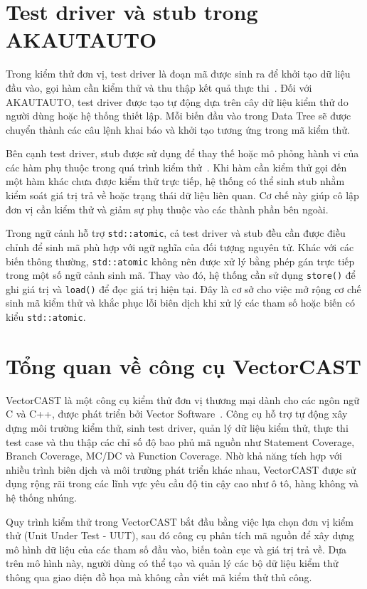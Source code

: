 \section{Test driver và stub trong AKAUTAUTO}

Trong kiểm thử đơn vị, test driver là đoạn mã được sinh ra để khởi tạo dữ liệu đầu vào, gọi hàm cần kiểm thử và thu thập kết quả thực thi~\cite{nguyenducanh2015}. Đối với AKAUTAUTO, test driver được tạo tự động dựa trên cây dữ liệu kiểm thử do người dùng hoặc hệ thống thiết lập. Mỗi biến đầu vào trong Data Tree sẽ được chuyển thành các câu lệnh khai báo và khởi tạo tương ứng trong mã kiểm thử.

Bên cạnh test driver, stub được sử dụng để thay thế hoặc mô phỏng hành vi của các hàm phụ thuộc trong quá trình kiểm thử~\cite{trannguyenhuong2022stub}. Khi hàm cần kiểm thử gọi đến một hàm khác chưa được kiểm thử trực tiếp, hệ thống có thể sinh stub nhằm kiểm soát giá trị trả về hoặc trạng thái dữ liệu liên quan. Cơ chế này giúp cô lập đơn vị cần kiểm thử và giảm sự phụ thuộc vào các thành phần bên ngoài.

Trong ngữ cảnh hỗ trợ \texttt{std::atomic}, cả test driver và stub đều cần được điều chỉnh để sinh mã phù hợp với ngữ nghĩa của đối tượng nguyên tử. Khác với các biến thông thường, \texttt{std::atomic} không nên được xử lý bằng phép gán trực tiếp trong một số ngữ cảnh sinh mã. Thay vào đó, hệ thống cần sử dụng \texttt{store()} để ghi giá trị và \texttt{load()} để đọc giá trị hiện tại. Đây là cơ sở cho việc mở rộng cơ chế sinh mã kiểm thử và khắc phục lỗi biên dịch khi xử lý các tham số hoặc biến có kiểu \texttt{std::atomic}.

\section{Tổng quan về công cụ VectorCAST}

VectorCAST là một công cụ kiểm thử đơn vị thương mại dành cho các ngôn ngữ C và C++, được phát triển bởi Vector Software~\cite{vectorcast2025}. Công cụ hỗ trợ tự động xây dựng môi trường kiểm thử, sinh test driver, quản lý dữ liệu kiểm thử, thực thi test case và thu thập các chỉ số độ bao phủ mã nguồn như Statement Coverage, Branch Coverage, MC/DC và Function Coverage. Nhờ khả năng tích hợp với nhiều trình biên dịch và môi trường phát triển khác nhau, VectorCAST được sử dụng rộng rãi trong các lĩnh vực yêu cầu độ tin cậy cao như ô tô, hàng không và hệ thống nhúng.

Quy trình kiểm thử trong VectorCAST bắt đầu bằng việc lựa chọn đơn vị kiểm thử (Unit Under Test - UUT), sau đó công cụ phân tích mã nguồn để xây dựng mô hình dữ liệu của các tham số đầu vào, biến toàn cục và giá trị trả về. Dựa trên mô hình này, người dùng có thể tạo và quản lý các bộ dữ liệu kiểm thử thông qua giao diện đồ họa mà không cần viết mã kiểm thử thủ công.

